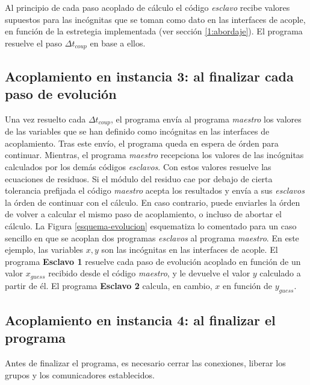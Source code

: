Al principio de cada paso acoplado de cálculo el código \textit{esclavo} recibe valores supuestos para las incógnitas que se toman como dato en las interfaces de acople,
en función de la estretegia implementada (ver sección \ref{1:abordaje}).
El programa resuelve el paso $\Delta t_{coup}$ en base a ellos.

\subsection*{Acoplamiento en instancia 3: al finalizar cada paso de evolución}

Una vez resuelto cada $\Delta t_{coup}$, el programa envía al programa \textit{maestro} los valores de las variables que se han definido como incógnitas en las interfaces de acoplamiento.
Tras este envío, el programa queda en espera de órden para continuar.
Mientras, el programa \textit{maestro} recepciona los valores de las incógnitas calculados por los demás códigos \textit{esclavos}.
Con estos valores resuelve las ecuaciones de residuos.
Si el módulo del residuo cae por debajo de cierta tolerancia prefijada el código \textit{maestro} acepta los resultados y envía a sus \textit{esclavos} la órden de continuar con el cálculo.
En caso contrario, puede enviarles la órden de volver a calcular el mismo paso de acoplamiento, o incluso de abortar el cálculo.
La Figura \ref{esquema-evolucion} esquematiza lo comentado para un caso sencillo en que se acoplan dos programas \textit{esclavos} al programa \textit{maestro}.
En este ejemplo, las variables $x,y$ son las incógnitas en las interfaces de acople.
El programa \textbf{Esclavo 1} resuelve cada paso de evolución acoplado en función de un valor $x_{guess}$ recibido desde el código \textit{maestro}, y le devuelve el valor $y$ calculado a partir de él.
El programa \textbf{Esclavo 2} calcula, en cambio, $x$ en función de $y_{guess}$.

\subsection*{Acoplamiento en instancia 4: al finalizar el programa}

Antes de finalizar el programa, es necesario cerrar las conexiones, liberar los grupos y los comunicadores establecidos.


